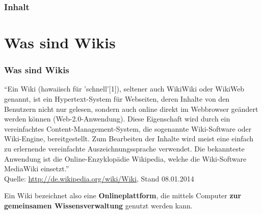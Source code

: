 \documentclass{beamer}              %
\begin{document}
\begin{frame}
  \frametitle{Inhalt}
  \tableofcontents
\end{frame}

\AtBeginSection{%
  \tableofcontents[currentsection]
}

\section{Was sind Wikis}

\begin{frame}
  \frametitle{Was sind Wikis}
  \begin{block}{}
    {\small \textquotedblleft Ein Wiki (hawaiisch für 'schnell'[1]), seltener auch WikiWiki
    oder WikiWeb genannt, ist ein Hypertext-System für Webseiten, deren
    Inhalte von den Benutzern nicht nur gelesen, sondern auch online direkt
    im Webbrowser geändert werden können (Web-2.0-Anwendung). Diese
    Eigenschaft wird durch ein vereinfachtes Content-Management-System, die
    sogenannte Wiki-Software oder Wiki-Engine, bereitgestellt. Zum
    Bearbeiten der Inhalte wird meist eine einfach zu erlernende
    vereinfachte Auszeichnungssprache verwendet. Die bekannteste Anwendung
    ist die Online-Enzyklopädie Wikipedia, welche die Wiki-Software
    MediaWiki einsetzt.\textquotedblright  \\ Quelle: \url{http://de.wikipedia.org/wiki/Wiki}, Stand 08.01.2014}
  \end{block}
  \begin{block}{}
    Ein Wiki bezeichnet also eine \textbf{Onlineplattform}, die mittels
    Computer \textbf{zur gemeinsamen Wissensverwaltung} genutzt werden
    kann.
  \end{block}
\end{frame}
\end{document}
